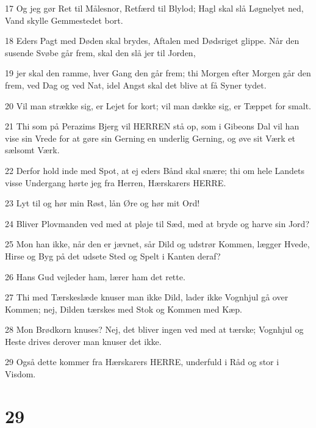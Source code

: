 \par 17 Og jeg gør Ret til Målesnor, Retfærd til Blylod; Hagl skal slå Løgnelyet ned, Vand skylle Gemmestedet bort.
\par 18 Eders Pagt med Døden skal brydes, Aftalen med Dødsriget glippe. Når den susende Svøbe går frem, skal den slå jer til Jorden,
\par 19 jer skal den ramme, hver Gang den går frem; thi Morgen efter Morgen går den frem, ved Dag og ved Nat, idel Angst skal det blive at få Syner tydet.
\par 20 Vil man strække sig, er Lejet for kort; vil man dække sig, er Tæppet for smalt.
\par 21 Thi som på Perazims Bjerg vil HERREN stå op, som i Gibeons Dal vil han vise sin Vrede for at gøre sin Gerning en underlig Gerning, og øve sit Værk et sælsomt Værk.
\par 22 Derfor hold inde med Spot, at ej eders Bånd skal snære; thi om hele Landets visse Undergang hørte jeg fra Herren, Hærskarers HERRE.
\par 23 Lyt til og hør min Røst, lån Øre og hør mit Ord!
\par 24 Bliver Plovmanden ved med at pløje til Sæd, med at bryde og harve sin Jord?
\par 25 Mon han ikke, når den er jævnet, sår Dild og udstrør Kommen, lægger Hvede, Hirse og Byg på det udsete Sted og Spelt i Kanten deraf?
\par 26 Hans Gud vejleder ham, lærer ham det rette.
\par 27 Thi med Tærskeslæde knuser man ikke Dild, lader ikke Vognhjul gå over Kommen; nej, Dilden tærskes med Stok og Kommen med Kæp.
\par 28 Mon Brødkorn knuses? Nej, det bliver ingen ved med at tærske; Vognhjul og Heste drives derover man knuser det ikke.
\par 29 Også dette kommer fra Hærskarers HERRE, underfuld i Råd og stor i Visdom.

\chapter{29}

